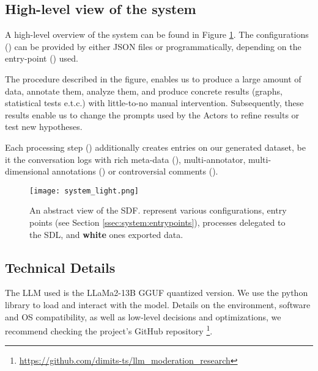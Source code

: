 \subsection{High-level view of the system}
\label{ssec:system:overview}

A high-level overview of the system can be found in Figure \ref{fig::system}. The configurations () can be provided by either JSON files or programmatically, depending on the entry-point () used. 

The procedure described in the figure, enables us to produce a large amount of data, annotate them, analyze them, and produce concrete results (graphs, statistical tests e.t.c.) with little-to-no manual intervention. Subsequently, these results enable us to change the prompts used by the Actors to refine results or test new hypotheses.

Each processing step () additionally creates entries on our generated dataset, be it the conversation logs with rich meta-data (), multi-annotator, multi-dimensional annotations () or controversial comments ().

\begin{figure}
	\centering
	\texttt{[image: system\_light.png]}
	\caption{An abstract view of the SDF.  represent various configurations,  entry points (see Section \ref{ssec:system:entrypoints}),  processes delegated to the SDL, and \textbf{white} ones exported data.}
	\label{fig::system}
\end{figure}



\subsection{Technical Details}
\label{ssec:system:details}

The LLM used is the LLaMa2-13B GGUF quantized version. We use the  python library to load and interact with the model. Details on the environment, software and OS compatibility, as well as low-level decisions and optimizations, we recommend checking the project's GitHub repository \footnote{\url{https://github.com/dimits-ts/llm_moderation_research}}.

